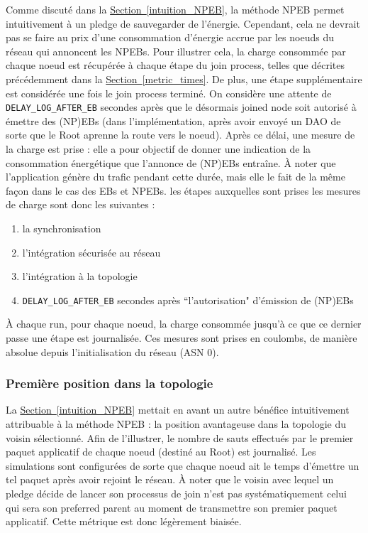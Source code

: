 \documentclass[]{report}
\newcommand{\wordlink}[2]{\hyperref[#2]{#1~\ref{#2}}}
\begin{document}
Comme discuté dans la \wordlink{Section}{intuition_NPEB}, la méthode NPEB permet intuitivement à un pledge de sauvegarder de l'énergie. Cependant, cela ne devrait pas se faire au prix d'une consommation d'énergie accrue par les noeuds du réseau qui annoncent les NPEBs. Pour illustrer cela, la charge consommée par chaque noeud est récupérée à chaque étape du join process, telles que décrites précédemment dans la \wordlink{Section}{metric_times}. De plus, une étape supplémentaire est considérée une fois le join process terminé. On considère une attente de \texttt{DELAY\_LOG\_AFTER\_EB} secondes après que le désormais joined node soit autorisé à émettre des (NP)EBs (dans l'implémentation, après avoir envoyé un DAO de sorte que le Root aprenne la route vers le noeud). Après ce délai, une mesure de la charge est prise : elle a pour objectif de donner une indication de la consommation énergétique que l'annonce de (NP)EBs entraîne. À noter que l'application génère du trafic pendant cette durée, mais elle le fait de la même façon dans le cas des EBs et NPEBs. les étapes auxquelles sont prises les mesures de charge sont donc les suivantes :

\begin{enumerate}
\item la synchronisation
\item l'intégration sécurisée au réseau
\item l'intégration à la topologie 
\item \texttt{DELAY\_LOG\_AFTER\_EB} secondes après ``l'autorisation" d'émission de (NP)EBs
\end{enumerate}
\vspace{0.2cm}
À chaque run, pour chaque noeud, la charge consommée jusqu'à ce que ce dernier passe une étape est journalisée. Ces mesures sont prises en coulombs, de manière absolue depuis l'initialisation du réseau (ASN 0).

\subsubsection{Première position dans la topologie}
\label{metric_hops}

La \wordlink{Section}{intuition_NPEB} mettait en avant un autre bénéfice intuitivement attribuable à la méthode NPEB : la position avantageuse dans la topologie du voisin sélectionné. Afin de l'illustrer, le nombre de sauts effectués par le premier paquet applicatif de chaque noeud (destiné au Root) est journalisé. Les simulations sont configurées de sorte que chaque noeud ait le temps d'émettre un tel paquet après avoir rejoint le réseau. À noter que le voisin avec lequel un pledge décide de lancer son processus de join n'est pas systématiquement celui qui sera son preferred parent au moment de transmettre son premier paquet applicatif. Cette métrique est donc légèrement biaisée.
\end{document}
